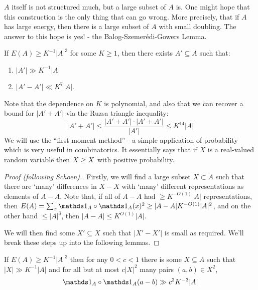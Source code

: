 \documentclass[10pt,a4paper]{article}
\let\E\relax
\DeclareMathOperator*{\E}{\raisebox{-0.45em}{\text{\huge $\mathds{E}$}}}
\begin{document}
$A$ itself is not structured much, but a large subset of $A$ is. One might hope that this construction is the only thing that can go wrong. More precisely, that if $A$ has large energy, then there is a large subset of $A$ with small doubling. The answer to this hope is yes! - the Balog-Szemer\'edi-Gowers Lemma.
\begin{lemma}
  If $E(A) \geq K^{-1} |A|^3$ for some $K \geq 1$, then there exists $A' \subseteq A$ such that:
  \begin{enumerate}
    \item $|A'| \gg K^{-1}|A|$
    \item $|A'-A'| \ll K^7 |A|$.
  \end{enumerate}
\end{lemma}
Note that the dependence on $K$ is polynomial, and also that we can recover a bound for $|A'+A'|$ via the Ruzsa triangle inequality:
\[|A'+A'| \leq \frac{|A'+A'|\cdot |A'+A'|}{|A'|} \leq K^{14}|A|\]
We will use the ``first moment method'' -  a simple application of probability which is very useful in combinatorics. It essentially says that if $X$ is a real-valued random variable then $X \geq \E X$ with positive probability.
\begin{proof}[Proof (following Schoen).]
  Firstly, we will find a large subset $X \subset A$ such that there are `many' differences in $X-X$ with `many' different representations as elements of $A-A$. Note that, if all of $A-A$ had $\geq K^{-O(1)}|A|$ representations, then $E(A) = \sum_x \one_A \circ \one_A (x)^2 \geq |A-A|K^{-O(1)}|A|^2$, and on the other hand $\leq |A|^3$, then $|A-A| \leq K^{O(1)}|A|$.

  We will then find some $X' \subseteq X$ such that $|X'-X'|$ is small as required. We'll break these steps up into the following lemmas.
\end{proof}
\begin{lemma}
  If $E(A) \geq K^{-1}|A|^3$ then for any $0 < c < 1$ there is some $X \subseteq A$ such that $|X| \gg K^{-1}|A|$ and for all but at most $c|X|^2$ many pairs $(a,b)\in X^2$,
  \[\one_A\circ \one_A (a-b) \gg c^2 K^{-3}|A|\]
\end{lemma}
\end{document}
